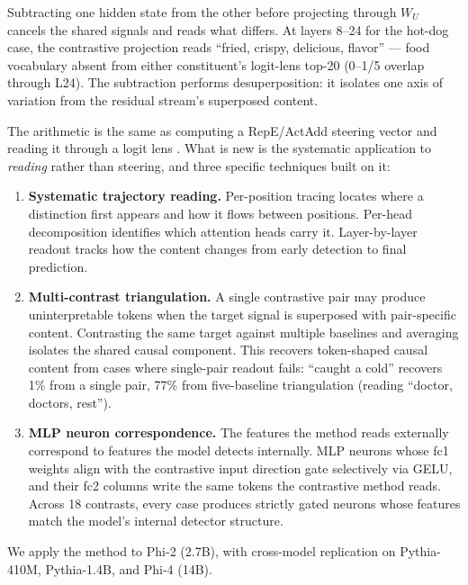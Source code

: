 \documentclass[11pt]{article}
\newcommand{\WU}{W_U}
\begin{document}
Subtracting one hidden state from the other before projecting through $\WU$
cancels the shared signals and reads what differs. At layers 8--24 for the
hot-dog case, the contrastive projection reads ``fried, crispy, delicious,
flavor'' --- food vocabulary absent from either constituent's logit-lens top-20
(0--1/5 overlap through L24). The subtraction performs desuperposition: it
isolates one axis of variation from the residual stream's superposed content.

The arithmetic is the same as computing a RepE/ActAdd steering vector
\citep{zou2023,turner2023} and reading it through a logit lens
\citep{nostalgebraist2020}. What is new is the systematic application to \emph{reading} rather than steering,
and three specific techniques built on it:

\begin{enumerate}[leftmargin=*]
\item \textbf{Systematic trajectory reading.} Per-position tracing locates where a
   distinction first appears and how it flows between positions. Per-head
   decomposition identifies which attention heads carry it. Layer-by-layer
   readout tracks how the content changes from early detection to final
   prediction.

\item \textbf{Multi-contrast triangulation.} A single contrastive pair may produce
   uninterpretable tokens when the target signal is superposed with
   pair-specific content. Contrasting the same target against multiple baselines
   and averaging isolates the shared causal component. This recovers
   token-shaped causal content from cases where single-pair readout fails:
   ``caught a cold'' recovers 1\% from a single pair, 77\% from five-baseline
   triangulation (reading ``doctor, doctors, rest'').

\item \textbf{MLP neuron correspondence.} The features the method reads externally
   correspond to features the model detects internally. MLP neurons whose fc1
   weights align with the contrastive input direction gate selectively via
   GELU, and their fc2 columns write the same tokens the contrastive method
   reads. Across 18 contrasts, every case produces strictly gated neurons
   whose features match the model's internal detector structure.
\end{enumerate}

We apply the method to Phi-2 (2.7B), with cross-model replication on
Pythia-410M, Pythia-1.4B, and Phi-4 (14B).
\end{document}
